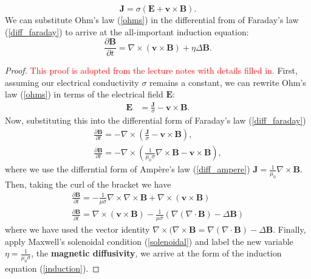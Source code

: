 \begin{equation}
    \mathbf{J}=\sigma(\mathbf{E}+\mathbf{v}\times\mathbf{B}). \label{ohms}
\end{equation}
We can substitute Ohm's law (\ref{ohms}) in the differential from of Faraday's law (\ref{diff_faraday}) to arrive at the all-important induction equation:
\begin{equation}
    \frac{\partial \textbf{B}}{\partial t}= \nabla\times(\mathbf{v}\times\mathbf{B})+\eta\Delta\mathbf{B}. \label{induction}
\end{equation}
\begin{proof}
    \textcolor{red}{This proof is adopted from the lecture notes with details filled in.} First, assuming our electrical conductivity $\sigma$ remains a constant, we can rewrite Ohm's law (\ref{ohms}) in terms of the electrical field $\mathbf{E}$:
    \begin{align*}
        \mathbf{E} &= \frac{\mathbf{J}}{\sigma}-\mathbf{v}\times\mathbf{B}.
    \end{align*}
    Now, substituting this into the differential form of Faraday's law (\ref{diff_faraday})
    \begin{align*}
        \frac{\partial \mathbf{B}}{\partial t} = - \nabla \times (\frac{\mathbf{J}}{\sigma}-\mathbf{v}\times\mathbf{B}), \\
        \frac{\partial \mathbf{B}}{\partial t} = -\nabla \times (\frac{1}{\mu_0\sigma}\nabla\times\mathbf{B}-\mathbf{v}\times\mathbf{B}),
    \end{align*}
    where we use the differntial form of Ampère's law (\ref{diff_ampere}) $\mathbf{J}=\frac{1}{\mu_0}\nabla\times\mathbf{B}$. Then, taking the curl of the bracket we have
    \begin{align*}
        \frac{\partial \mathbf{B}}{\partial t} = -\frac{1}{\mu\sigma}\nabla\times\nabla\times\mathbf{B}+\nabla\times(\mathbf{v}\times\mathbf{B}) \\
        \frac{\partial \mathbf{B}}{\partial t} = \nabla\times(\mathbf{v}\times\mathbf{B}) - \frac{1}{\mu\sigma}(\nabla(\nabla\cdot\mathbf{B})-\Delta\mathbf{B})
    \end{align*}
    where we have used the vector identity $\nabla\times(\nabla\times\mathbf{B}=\nabla(\nabla\cdot\mathbf{B})-\Delta\mathbf{B}$. Finally, apply Maxwell's solenoidal condition (\ref{solenoidal}) and label the new variable $\eta = \frac{1}{\mu_0\sigma}$, the \textbf{magnetic diffusivity}, we arrive at the form of the induction equation (\ref{induction}).
\end{proof}

